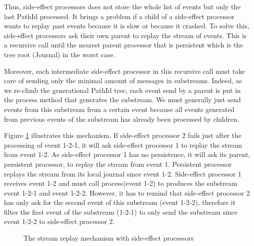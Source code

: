 Thus, side-effect processors does not store the whole list of events but only the last PathId processed. It brings a problem if a child of a side-effect processor
wants to replay past events because it is slow or because it crashed. To solve this, side-effect processors ask their own parent to replay the stream of events.
This is a recursive call until the nearest parent processor that is persistent which is the tree root (Journal) in the worst case. 

Moreover, each intermediate side-effect processor in this recursive call must take care of sending only the minimal amount of messages in substreams. Indeed,
as we re-climb the generational PathId tree, each event send by a parent is put in the process method that generates the substream. We must generally just send
events from this substream from a certain event because all events generated from previous events of the substream has already been processed by children. 

Figure \ref{fig:sideeffectreclimb} illustrates this mechanism. If side-effect processor 2 fails just after the processing of event 1-2-1, it will ask side-effect processor 1 to replay the stream from event 1-2. As side-effect processor 1 has no persistence, it will ask its parent, persistent processor, to replay the stream from
event 1. Persistent processor replays the stream from its local journal since event 1-2. Side-effect processor 1 receives event 1-2 and must call process(event 1-2) to
produces the substream event 1-2-1 and event 1-2-2. However, it has to remind that side-effect processor 2 has only ask for the second event of this substream (event 1-2-2), therefore it filter the first event of the substream (1-2-1) to only send the substream since event 1-2-2 to side-effect processor 2. 
\\

\begin{figure}[h]
  \begin{center} 
    \caption{The stream replay mechanism with side-effect processors}
    \label{fig:sideeffectreclimb}
  \end{center}
\end{figure}

